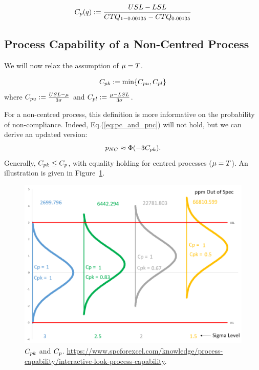 \begin{definition}[$\cpq$]
\begin{align}
	C_p(q):= \frac{USL-LSL}{CTQ_{1-0.00135}-CTQ_{0.00135}}
\end{align}
\end{definition}






\subsection{Process Capability of a Non-Centred Process}
We will now relax the assumption of $\mu=T$.

\begin{definition}[$\cpk$]
\begin{align}
	C_{pk}:= \min\{ C_{pu},C_{pl} \}
\end{align}
where $C_{pu}:= \frac{USL- \mu}{3 \sigma}$ and $C_{pl}:= \frac{\mu-LSL}{3 \sigma}$.
\end{definition}
For a non-centred process, this definition is more informative on the probability of non-compliance.
Indeed, Eq.(\ref{eq:pc_and_pnc}) will not hold, but we can derive an updated version:
\begin{align}
	 p_{NC} \approx \Phi(-3 C_{pk}).
\end{align}
Generally, $C_{pk} \leq C_p$, with equality holding for centred processes ($\mu=T$).
An illustration is given in Figure~\ref{fig:cpk}.


\begin{figure}
\centering
\includegraphics[height=0.3\textheight]{art/Cpk_same_sigma_varying_avg}
\caption[$\cpk$ and $\cp$]{$\cpk$ and $\cp$. \newline
\url{https://www.spcforexcel.com/knowledge/process-capability/interactive-look-process-capability}.}
\label{fig:cpk}
\end{figure}



